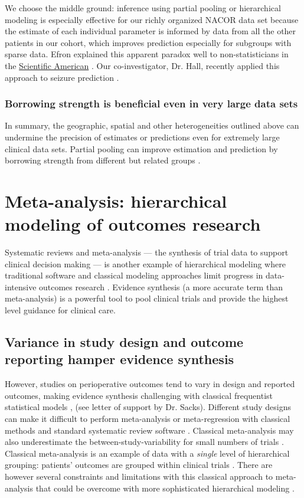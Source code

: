 \documentclass[11pt,notitlepage]{article}
\begin{document}
We choose the middle ground: inference using partial pooling or hierarchical modeling is especially effective 
for our richly organized NACOR data set because the estimate of each individual parameter is informed by data from 
all the other patients in our cohort, which improves prediction especially for subgroups with sparse data. \cite{Gelman2009} 
Efron explained this apparent paradox well to non-statisticians in the 
\href{http://www.nature.com/scientificamerican/journal/v236/n5/pdf/
scientificamerican0577-119.pdf}{Scientific American}
\cite{Stein_paradox_Scientific_American}. 
Our co-investigator, Dr. Hall, recently applied this approach to seizure prediction \cite{Hall2009a}.

\subsubsection*{Borrowing strength is beneficial even in very large data sets}
In summary, the geographic, spatial and other heterogeneities outlined above  
can undermine the precision of estimates or predictions even for 
extremely large clinical data sets. Partial pooling can improve estimation and prediction
by borrowing strength from different but related groups
\cite{Tukey1963borrowing,Jones1986collected}. 

\section*{Meta-analysis: hierarchical modeling of outcomes research}
Systematic reviews and meta-analysis \cite{Sackett1996} --- the synthesis of trial data 
to support clinical decision making --- is another example of hierarchical modeling where traditional software and 
classical modeling approaches limit progress in data-intensive outcomes research \cite{Andreae2015}.  
Evidence synthesis (a more accurate term than meta-analysis) is a powerful tool 
to pool clinical trials and provide the highest level guidance for clinical care\cite{Ashby2000,Cook1997}. 

\subsection*{Variance in study design and outcome reporting hamper evidence synthesis}
However, studies on perioperative outcomes tend to vary in design and reported outcomes\cite{Andreae2013}, making 
evidence synthesis challenging with classical frequentist statistical models \cite{Spiegelhalter_11134920}, (see 
letter of support by Dr. Sacks). Different study designs can make it difficult to perform meta-analysis or meta-regression 
with classical methods and standard systematic review software \cite{Deeks2011chapter}. Classical meta-analysis may also 
underestimate the between-study-variability for small numbers of trials \cite{Song2012,Cornell2014,Andreae2015}. 
Classical meta-analysis is an example of data with a \textit{single} level of hierarchical grouping: patients' 
outcomes are grouped within clinical trials \cite{egger2008systematic}. There are however several constraints and limitations 
with this classical approach to meta-analysis that could be overcome with more sophisticated hierarchical modeling  
\cite{Andreae2015,Thompson2002,Abroug2011}.
\end{document}
